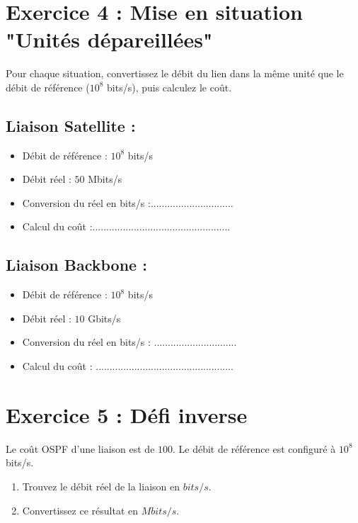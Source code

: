 \section*{Exercice 4 : Mise en situation "Unités dépareillées"}
Pour chaque situation, convertissez le débit du lien dans la même unité que le débit de référence ($10^8$ bits/s), puis calculez le coût.
\subsection*{Liaison Satellite :}
\begin{itemize}
    \item Débit de référence : $10^8$ bits/s
    \item Débit réel : $50$ Mbits/s
    \item Conversion du réel en bits/s :..............................
    \item Calcul du coût :..................................................
\end{itemize}


\subsection*{Liaison Backbone :}
\begin{itemize}
    \item Débit de référence : $10^8$ bits/s
    \item Débit réel : $10$ Gbits/s
    \item Conversion du réel en bits/s : ..............................
    \item Calcul du coût : ..................................................

\end{itemize}



\section*{Exercice 5 : Défi inverse}
Le coût OSPF d'une liaison est de $100$. Le débit de référence est configuré à $10^8$ bits/s.
\begin{enumerate}
    \item Trouvez le débit réel de la liaison en $bits/s$.
    \item Convertissez ce résultat en $Mbits/s$.
\end{enumerate}
 
